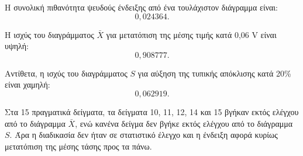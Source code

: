 \documentclass[12pt,a4paper]{article}
\begin{document}
Η συνολική πιθανότητα ψευδούς ένδειξης από ένα τουλάχιστον διάγραμμα είναι:
\[
    \boxed{0{,}024364}.
\]

Η ισχύς του διαγράμματος \(\bar X\) για μετατόπιση της μέσης τιμής κατά
0,06 V είναι υψηλή:
\[
    \boxed{0{,}908777}.
\]

Αντίθετα, η ισχύς του διαγράμματος \(S\) για αύξηση της τυπικής απόκλισης κατά
20\% είναι χαμηλή:
\[
    \boxed{0{,}062919}.
\]

Στα 15 πραγματικά δείγματα, τα δείγματα 10, 11, 12, 14 και 15 βγήκαν εκτός
ελέγχου από το διάγραμμα \(\bar X\), ενώ κανένα δείγμα δεν βγήκε εκτός ελέγχου
από το διάγραμμα \(S\). Άρα η διαδικασία δεν ήταν σε στατιστικό έλεγχο και η
ένδειξη αφορά κυρίως μετατόπιση της μέσης τάσης προς τα πάνω.
\end{document}
